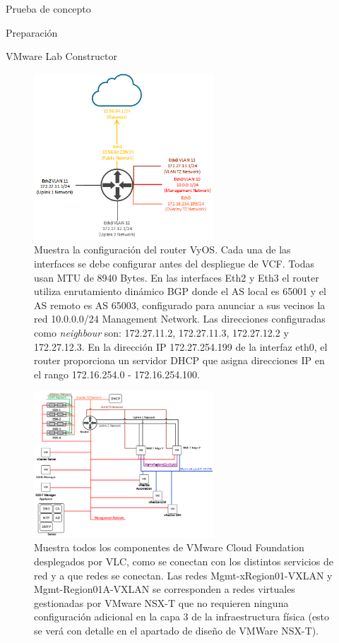 \begin{section}{Prueba de concepto}
\begin{subsection}{Preparación}
\begin{subsubsection}{VMware Lab Constructor}
\begin{figure}[h!]
      \label{fig:VMs-alojadas-host-fisico}
    \end{figure}
    \begin{figure}[h!]
      \centering
      \includegraphics[width=0.6\textwidth]{imaxes/pruebaconcepto/RouterFisicoL3.png}
      \caption{Muestra la configuración del router VyOS. Cada una de las interfaces se debe configurar antes del despliegue de VCF. Todas usan MTU de 8940 Bytes. 
      En las interfaces Eth2 y Eth3 el router utiliza enrutamiento dinámico BGP donde el AS local es 65001 y el AS remoto es AS 65003, configurado para anunciar a sus vecinos la red 10.0.0.0/24 Management Network. Las direcciones configuradas como \textit{neighbour} son: 172.27.11.2, 172.27.11.3, 172.27.12.2 y 172.27.12.3. En la dirección IP 172.27.254.199 de la interfaz eth0, el router proporciona un servidor DHCP que asigna direcciones IP en el rango 172.16.254.0 - 172.16.254.100.}
      \label{fig:interfaces-router-fisico-L3}
    \end{figure}
    \begin{figure}[h!]
      \centering
      \includegraphics[width=0.6\textwidth]{imaxes/pruebaconcepto/RedDesdeDentro.png}
      \caption{Muestra todos los componentes de VMware Cloud Foundation desplegados por VLC, como se conectan con los distintos servicios de red y a que redes se conectan. Las redes Mgmt-xRegion01-VXLAN y Mgmt-Region01A-VXLAN se corresponden a redes virtuales gestionadas por VMware NSX-T que no requieren ninguna configuración adicional en la capa 3 de la infraestructura física (esto se verá con detalle en el apartado de diseño de VMWare NSX-T).}
      \label{fig:red-L3-infraestructura-fisica}
    \end{figure}
    \FloatBarrier
  \end{subsubsection}
  

\end{subsection}
\end{section}
